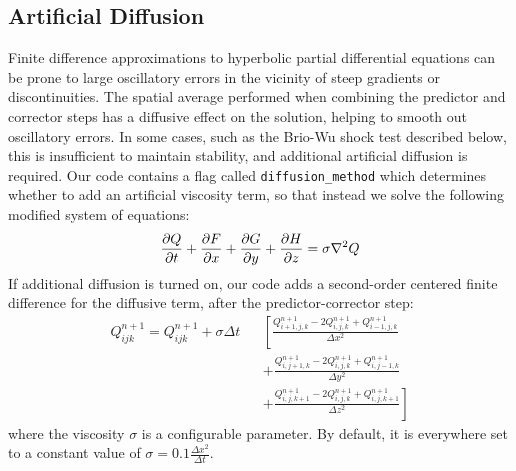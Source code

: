 \documentclass[%
 reprint,
 amsmath,amssymb,
 aps,
]{revtex4-2}
\begin{document}
\subsection{Artificial Diffusion}

Finite difference approximations to hyperbolic partial differential equations can be prone to large oscillatory errors in the vicinity of steep gradients or discontinuities. The spatial average performed when combining the predictor and corrector steps has a diffusive effect on the solution, helping to smooth out oscillatory errors. In some cases, such as the Brio-Wu shock test described below, this is insufficient to maintain stability, and additional artificial diffusion is required. Our code contains a flag called \texttt{diffusion\_method} which determines whether to add an artificial viscosity term, so that instead we solve the following modified system of equations:
\begin{equation}
\pdv{Q}{t} + \pdv{F}{x} + \pdv{G}{y} + \pdv{H}{z} = \sigma \nabla ^2 Q
\end{equation}
If additional diffusion is turned on, our code adds a second-order centered finite difference for the diffusive term, after the predictor-corrector step:
\begin{eqnarray*}
Q_{ijk} ^{n+1} = Q_{ijk} ^{n+1} + \sigma \Delta t &  & \left[\frac{Q_{i+1, j, k} ^{n+1} - 2 Q_{i, j, k} ^{n+1} + Q_{i-1,j,k} ^{n+1}}{\Delta x^2} \right. \\
& & + \frac{Q_{i, j+1, k} ^{n+1} - 2 Q_{i, j, k} ^{n+1} + Q_{i,j-1,k} ^{n+1}}{\Delta y ^2} \\
& & \left. + \frac{Q_{i, j, k + 1} ^{n+1} - 2 Q_{i, j, k} ^{n+1} + Q_{i,j,k + 1} ^{n+1}}{\Delta z^2} \right]
\end{eqnarray*}
where the viscosity $\sigma$ is a configurable parameter. By default, it is everywhere set to a constant value of $\sigma = 0.1 \frac{\Delta x ^2}{\Delta t}$.
\end{document}
